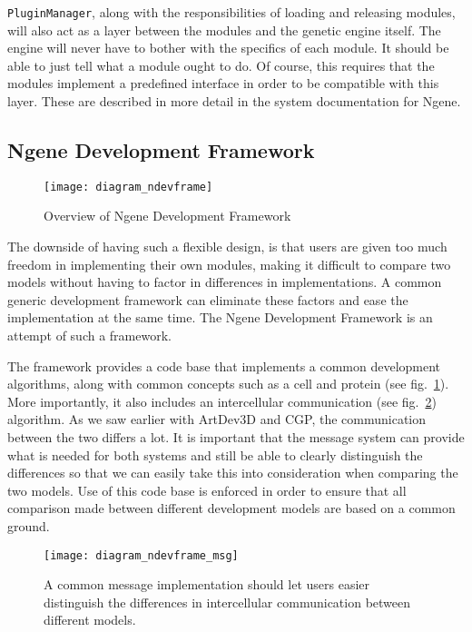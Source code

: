 \texttt{PluginManager}, along with the responsibilities of loading and releasing modules, will also act as a layer between the modules and the genetic engine itself. The engine will never have to bother with the specifics of each module. It should be able to just tell what a module ought to do. Of course, this requires that the modules implement a predefined interface in order to be compatible with this layer. These are described in more detail in the system documentation for Ngene.


\subsection{Ngene Development Framework}
\begin{figure}[!ht]
	\centering
	\texttt{[image: diagram\_ndevframe]}
	\caption{Overview of Ngene Development Framework}
	\label{fig:diagram_ndevframe}
\end{figure}

The downside of having such a flexible design, is that users are given too much freedom in implementing their own modules, making it difficult to compare two models without having to factor in differences in implementations. A common generic development framework can eliminate these factors and ease the implementation at the same time. The Ngene Development Framework is an attempt of such a framework.

The framework provides a code base that implements a common development algorithms, along with common concepts such as a cell and protein (see fig.~\ref{fig:diagram_ndevframe}). More importantly, it also includes an intercellular communication (see fig.~\ref{fig:diagram_ndevframe_msg}) algorithm. As we saw earlier with ArtDev3D and CGP, the communication between the two differs a lot. It is important that the message system can provide what is needed for both systems and still be able to clearly distinguish the differences so that we can easily take this into consideration when comparing the two models. Use of this code base is enforced in order to ensure that all comparison made between different development models are based on a common ground.

\begin{figure}[!ht]
	\centering
	\texttt{[image: diagram\_ndevframe\_msg]}
	\caption{A common message implementation should let users easier distinguish the differences in intercellular communication between different models.}
	\label{fig:diagram_ndevframe_msg}
\end{figure}

